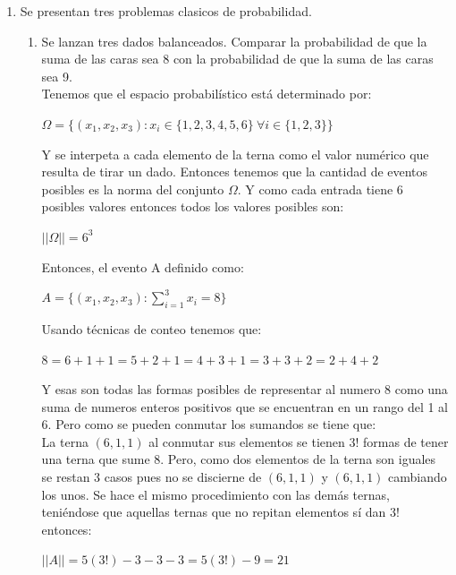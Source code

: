 \documentclass[12pt,a4paper]{report}
\begin{document}
\begin{enumerate}
   \item {
    Se presentan tres problemas clasicos de probabilidad. 
    
    \begin{enumerate}[label=\alph*) ]
    \item{Se lanzan tres dados balanceados. Comparar la probabilidad de que la suma de las caras sea 8 con la probabilidad de que la suma de las caras sea 9.
    \\
    Tenemos que el espacio probabilístico está determinado por:\\
    
    \begin{center}
    $\Omega = \lbrace (x_{1},x_{2},x_{3}) : x_{i} \in \lbrace 1,2,3,4,5,6 \rbrace \ \forall i\in \lbrace 1,2,3 \rbrace \rbrace$
    \end{center} 
    Y se interpeta a cada elemento de la terna como el valor numérico que resulta de tirar un dado. Entonces tenemos que la cantidad de eventos posibles es la norma del conjunto $\Omega$. Y como cada entrada tiene 6 posibles valores entonces todos los valores posibles son:\\
    \begin{center}
    $||\Omega|| = 6^3$
    \end{center}
    Entonces, el evento A definido como: \\
    \begin{center}
    $A= \lbrace (x_{1},x_{2},x_{3}) : \sum\limits_{i=1}^{3} x_{i} = 8 \rbrace$
    \end{center}
    Usando técnicas de conteo tenemos que:\\
    \begin{center}
    $8 = 6+1+1=5+2+1=4+3+1=3+3+2=2+4+2$
    \end{center}
    Y esas son todas las formas posibles de representar al numero 8 como una suma de numeros enteros positivos que se encuentran en un rango del 1 al 6. Pero como se pueden conmutar los sumandos se tiene que: \\
La terna $(6,1,1)$ al conmutar sus elementos se tienen $3!$ formas de tener una terna que sume 8. Pero, como dos elementos de la terna son iguales se restan 3 casos pues no se discierne de $(6,1,1)$ y $(6,1,1)$ cambiando los unos. Se hace el mismo procedimiento con las demás ternas, teniéndose que aquellas ternas que no repitan elementos sí dan $3!$ entonces:\\
\begin{center}
$||A||=5(3!)-3-3-3=5(3!)-9=21$

\end{center}}
\end{enumerate}}
\end{enumerate}
\end{document}
